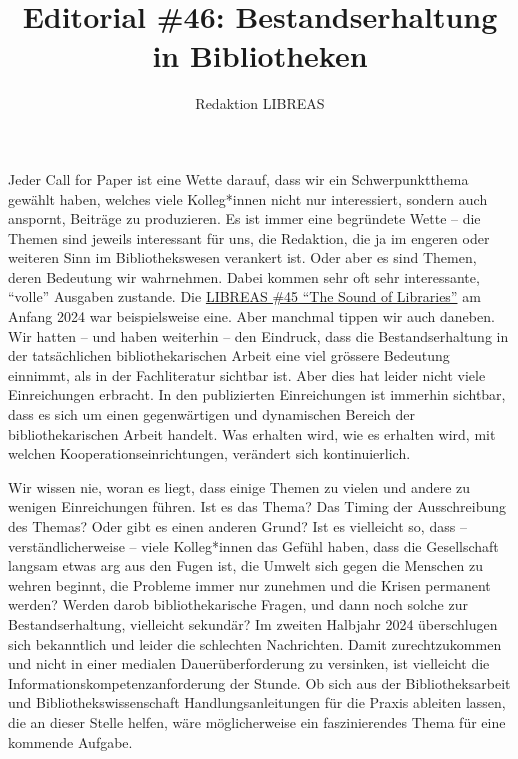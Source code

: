 \documentclass[a4paper,
fontsize=11pt,
oneside,
numbers=noperiodatend,
parskip=half-,
bibliography=totoc,
final
]{scrartcl}
\title{\LARGE{Editorial \#46: Bestandserhaltung in Bibliotheken}}%
\author{Redaktion LIBREAS} %
\date{}
\begin{document}
\maketitle
\thispagestyle{fancyplain} 


Jeder Call for Paper ist eine Wette darauf, dass wir ein
Schwerpunktthema gewählt haben, welches viele Kolleg*innen nicht nur
interessiert, sondern auch anspornt, Beiträge zu produzieren. Es ist
immer eine begründete Wette -- die Themen sind jeweils interessant für
uns, die Redaktion, die ja im engeren oder weiteren Sinn im
Bibliothekswesen verankert ist. Oder aber es sind Themen, deren
Bedeutung wir wahrnehmen. Dabei kommen sehr oft sehr interessante,
\enquote{volle} Ausgaben zustande. Die
\href{https://libreas.eu/ausgabe45/inhalt/}{LIBREAS \#45  \enquote{The Sound of
Libraries}} am Anfang 2024 war beispielsweise eine. Aber manchmal
tippen wir auch daneben. Wir hatten -- und haben weiterhin -- den
Eindruck, dass die Bestandserhaltung in der tatsächlichen
bibliothekarischen Arbeit eine viel grössere Bedeutung einnimmt, als in
der Fachliteratur sichtbar ist. Aber dies hat leider nicht viele
Einreichungen erbracht. In den publizierten Einreichungen ist immerhin
sichtbar, dass es sich um einen gegenwärtigen und dynamischen Bereich
der bibliothekarischen Arbeit handelt. Was erhalten wird, wie es
erhalten wird, mit welchen Kooperationseinrichtungen, verändert sich
kontinuierlich.

Wir wissen nie, woran es liegt, dass einige Themen zu vielen und andere
zu wenigen Einreichungen führen. Ist es das Thema? Das Timing der
Ausschreibung des Themas? Oder gibt es einen anderen Grund? Ist es
vielleicht so, dass – verständlicherweise – viele Kolleg*innen das
Gefühl haben, dass die Gesellschaft langsam etwas arg aus den Fugen ist,
die Umwelt sich gegen die Menschen zu wehren beginnt, die Probleme immer
nur zunehmen und die Krisen permanent werden? Werden darob
bibliothekarische Fragen, und dann noch solche zur Bestandserhaltung,
vielleicht sekundär? Im zweiten Halbjahr 2024 überschlugen sich
bekanntlich und leider die schlechten Nachrichten. Damit zurechtzukommen
und nicht in einer medialen Dauerüberforderung zu versinken, ist
vielleicht die Informationskompetenzanforderung der Stunde. Ob sich aus
der Bibliotheksarbeit und Bibliothekswissenschaft Handlungsanleitungen
für die Praxis ableiten lassen, die an dieser Stelle helfen, wäre
möglicherweise ein faszinierendes Thema für eine kommende Aufgabe.
\end{document}
